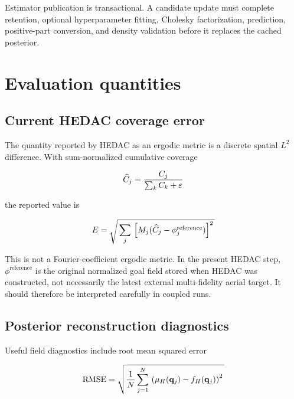\documentclass[11pt]{article}
\begin{document}
Estimator publication is transactional. A candidate update must complete retention, optional hyperparameter fitting, Cholesky factorization, prediction, positive-part conversion, and density validation before it replaces the cached posterior.


\section{Evaluation quantities}


\subsection{Current HEDAC coverage error}


The quantity reported by HEDAC as an ergodic metric is a discrete spatial $L^2$ difference. With sum-normalized cumulative coverage


\begin{equation}
\widehat C_j \\
= \\
\frac{C_j}{\sum_kC_k+\varepsilon}
\end{equation}


the reported value is


\begin{equation}
E \\
= \\
\sqrt{ \\
\sum_j \\
\left[ \\
M_j(\widehat C_j-\phi_j^{\mathrm{reference}}) \\
\right]^2 \\
}
\end{equation}


This is not a Fourier-coefficient ergodic metric. In the present HEDAC step, $\phi^{\mathrm{reference}}$ is the original normalized goal field stored when HEDAC was constructed, not necessarily the latest external multi-fidelity aerial target. It should therefore be interpreted carefully in coupled runs.


\subsection{Posterior reconstruction diagnostics}


Useful field diagnostics include root mean squared error


\begin{equation}
\mathrm{RMSE} \\
= \\
\sqrt{ \\
\frac{1}{N} \\
\sum_{j=1}^{N} \\
\left( \\
\mu_H(\mathbf q_j)-f_H(\mathbf q_j) \\
\right)^2 \\
}
\end{equation}
\end{document}
